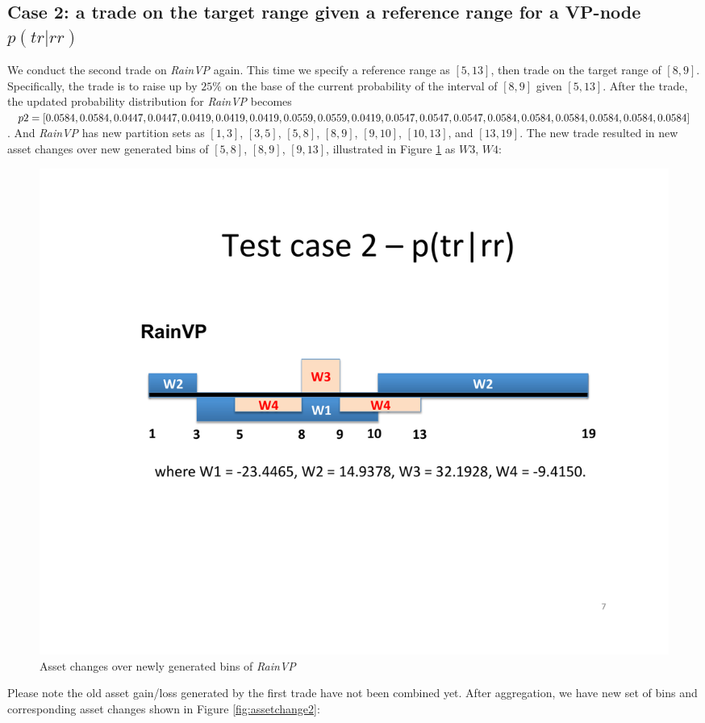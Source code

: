 \documentclass[onecolumn]{article}
\begin{document}
\subsection{Case 2: a trade on the target range given a reference range for a VP-node $p(tr|rr)$}
We conduct the second trade on \textit{RainVP} again. This time we specify a reference range as $[5,13]$, then trade on the target range of $[8,9]$. Specifically, the trade is to raise up by $25\%$ on the base of the current probability of the interval of $[8,9]$ given $[5,13]$. After the trade, the updated probability distribution for \textit{RainVP} becomes $p2=[0.0584, 0.0584, 0.0447, 0.0447, 0.0419, 0.0419, 0.0419, 0.0559, 0.0559, 0.0419, 0.0547, 0.0547, 0.0547, 0.0584, 0.0584, 0.0584, \\0.0584, 0.0584, 0.0584]$. And \textit{RainVP} has new partition sets as $[1,3]$, $[3,5]$, $[5,8]$, $[8,9]$, $[9,10]$, $[10, 13]$, and $[13, 19]$. The new trade resulted in new asset changes over new generated bins of $[5,8]$, $[8,9]$, $[9,13]$, illustrated in Figure \ref{fig:trade2} as $W3$, $W4$:

\begin{figure}[tbh]
    \centering    
    \includegraphics[scale=0.65]{DAC_VP_figure/trade2_rainVP.pdf}     
    \caption{Asset changes over newly generated bins of \textit{RainVP}} 
    \label{fig:trade2} 
\end{figure}

Please note the old asset gain/loss generated by the first trade have not been combined yet. After aggregation, we have new set of bins and corresponding asset changes shown in Figure \ref{fig:assetchange2}:
\end{document}

